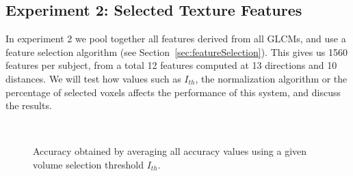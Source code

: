 \subsection{Experiment 2: Selected Texture Features}
In experiment 2 we pool together all features derived from all \acp{GLCM}, and use a feature selection algorithm (see Section~\ref{sec:featureSelection}). This gives us 1560 features per subject, from a total 12 features computed at 13 directions and 10 distances. We will test how values such as $I_{th}$, the normalization algorithm or the percentage of selected voxels affects the performance of this system, and discuss the results. 

\begin{figure}[htp]
	\centering
	\\
	\caption{Accuracy obtained by averaging all accuracy values using a given volume selection threshold $I_{th}$.}
	\label{fig:averageAcc_IthNorm}
\end{figure}

